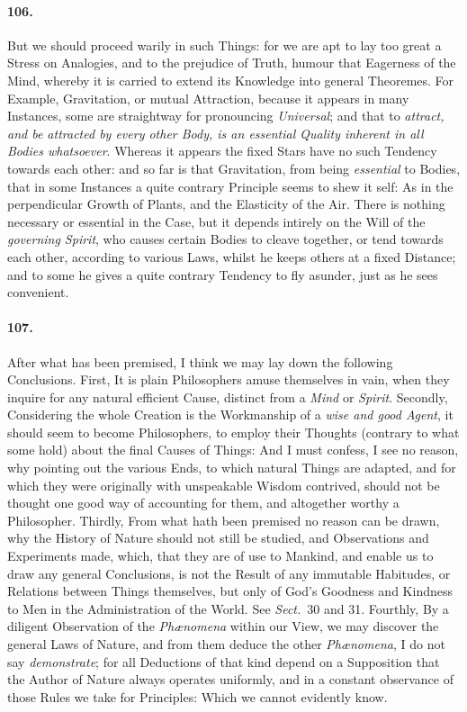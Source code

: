 \documentclass[]{article}
\newenvironment{sectionbody}{\begin{multicols}{2}}{\end{multicols}}
\begin{document}
\begin{sectionbody}
\paragraph{106.} But we should proceed warily in such Things: for we are apt to
lay too great a Stress on Analogies, and to the prejudice of
Truth, humour that Eagerness of the Mind, whereby it is carried
to extend its Knowledge into general Theoremes.  For Example,
Gravitation, or mutual Attraction, because it appears in many
Instances, some are straightway for pronouncing
\emph{Universal}; and that to \emph{attract, and be attracted by
every other Body, is an essential Quality inherent in all Bodies
whatsoever}.  Whereas it appears the fixed Stars have no such
Tendency towards each other: and so far is that Gravitation, from
being \emph{essential} to Bodies, that in some Instances a
quite contrary Principle seems to shew it self: As in the
perpendicular Growth of Plants, and the Elasticity of the Air.
There is nothing necessary or essential in the Case, but it
depends intirely on the Will of the \emph{governing Spirit},
who causes certain Bodies to cleave together, or tend towards
each other, according to various Laws, whilst he keeps others at
a fixed Distance; and to some he gives a quite contrary Tendency
to fly asunder, just as he sees convenient.



\paragraph{107.} After what has been premised, I think we may lay down the
following Conclusions.  First, It is plain Philosophers amuse
themselves in vain, when they inquire for any natural efficient
Cause, distinct from a \emph{Mind} or \emph{Spirit}.
Secondly, Considering the whole Creation is the Workmanship of a
\emph{wise and good Agent}, it should seem to become
Philosophers, to employ their Thoughts (contrary to what some
hold) about the final Causes of Things: And I must confess, I see
no reason, why pointing out the various Ends, to which natural
Things are adapted, and for which they were originally with
unspeakable Wisdom contrived, should not be thought one good way
of accounting for them, and altogether worthy a Philosopher.
Thirdly, From what hath been premised no reason can be drawn, why
the History of Nature should not still be studied, and
Observations and Experiments made, which, that they are of use to
Mankind, and enable us to draw any general Conclusions, is not
the Result of any immutable Habitudes, or Relations between
Things themselves, but only of {\sc God}'s Goodness and Kindness to Men
in the Administration of the World.  See
\emph{Sect.}\ 30 and 31.
Fourthly, By a diligent Observation of the
\emph{Ph{\ae}nomena} within our View, we may discover the
general Laws of Nature, and from them deduce the other
\emph{Ph{\ae}nomena}, I do not say \emph{demonstrate}; for
all Deductions of that kind depend on a Supposition that the
Author of Nature always operates uniformly, and in a constant
observance of those Rules we take for Principles: Which we cannot
evidently know.




\end{sectionbody}
\end{document}
